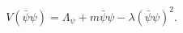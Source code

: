 \begin{equation}\label{eq:model-V}
  V(\bar{\psi}\psi)=\Lambda_\psi+m\bar{\psi}{\psi}-\lambda (\bar{\psi}\psi)^2. 
\end{equation}

